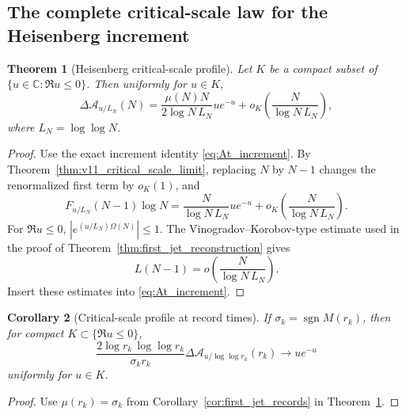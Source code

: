 \documentclass[11pt]{amsart}
\numberwithin{equation}{section}
\theoremstyle{plain}
\newtheorem{theorem}{Theorem}[section]
\newtheorem{corollary}[theorem]{Corollary}
\theoremstyle{definition}
\theoremstyle{remark}
\begin{document}
\subsection{The complete critical-scale law for the Heisenberg increment}
\label{subsec:v11_Heisenberg_scale_limit}

\begin{theorem}[Heisenberg critical-scale profile]
\label{thm:v11_Heisenberg_scale_profile}
Let \(K\) be a compact subset of \(\{u\in\mathbb C:\Re u\le0\}\).  Then
uniformly for \(u\in K\),
\begin{equation}
\boxed{
\Delta\mathcal A_{u/L_N}(N)
=\frac{\mu(N)N}{2\log N\,L_N}
ue^{-u}
+o_K\!\left(\frac{N}{\log N\,L_N}\right),}
\label{eq:v11_Heisenberg_scale_profile}
\end{equation}
where \(L_N=\log\log N\).
\end{theorem}

\begin{proof}
Use the exact increment identity \eqref{eq:At_increment}.  By
Theorem~\ref{thm:v11_critical_scale_limit}, replacing \(N\) by \(N-1\)
changes the renormalized first term by \(o_K(1)\), and
\begin{equation}
F_{u/L_N}(N-1)\log N
=\frac{N}{\log N\,L_N}ue^{-u}
+o_K\!\left(\frac{N}{\log N\,L_N}\right).
\label{eq:v11_first_area_term_scale}
\end{equation}
For \(\Re u\le0\),
\(|e^{(u/L_N)\Omega(N)}|\le1\).  The Vinogradov--Korobov-type estimate used
in the proof of Theorem~\ref{thm:first_jet_reconstruction} gives
\begin{equation}
L(N-1)
=o\!\left(\frac{N}{\log N\,L_N}\right).
\label{eq:v11_L_negligible_scale}
\end{equation}
Insert these estimates into \eqref{eq:At_increment}.
\end{proof}

\begin{corollary}[Critical-scale profile at record times]
\label{cor:v11_Heisenberg_record_profile}
If \(\sigma_k=\operatorname{sgn}M(r_k)\), then for compact
\(K\subset\{\Re u\le0\}\),
\begin{equation}
\boxed{
\frac{2\log r_k\,\log\log r_k}{\sigma_k r_k}
\Delta\mathcal A_{u/\log\log r_k}(r_k)
\longrightarrow ue^{-u}}
\label{eq:v11_Heisenberg_record_profile}
\end{equation}
uniformly for \(u\in K\).
\end{corollary}

\begin{proof}
Use \(\mu(r_k)=\sigma_k\) from Corollary~\ref{cor:first_jet_records} in
Theorem~\ref{thm:v11_Heisenberg_scale_profile}.
\end{proof}
\end{document}
